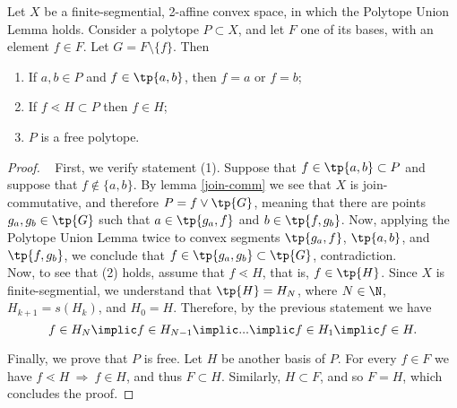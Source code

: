 \documentclass[12pt, a4paper]{article}
\newcommand{\btw}{\lessdot}
\begin{document}
\begin{theorem}\label{th-segm-free}
    Let \(X\) be a finite-segmential, 2-affine convex space, in which the Polytope Union Lemma holds. Consider a polytope \(P \subset X\), and let \(F\) one of its bases, with an element \(f \in F\). Let \(G = F \setminus \{f\}\). Then

    \begin{enumerate}
        \item If \(a, b \in P\) and \(f \in \tp{a, b}\), then \(f = a\) or \(f = b\);
        \item If \(f \btw H \subset P\) then \(f \in H\);
        \item \(P\) is a free polytope.
    \end{enumerate}
\end{theorem}
\begin{proof}~
    First, we verify statement (1). Suppose that \(f \in \tp{a, b} \subset P\) and suppose that \(f \nin \{a, b\}\). By lemma \ref{join-comm} we see that \(X\) is join-commutative, and therefore \(P = f \vee \tp{G}\), meaning that there are points \(g_a, g_b \in \tp{G}\) such that \(a \in \tp{g_a, f}\) and \(b \in \tp{f, g_b}\). Now, applying the Polytope Union Lemma twice to convex segments \(\tp{g_a, f}\), \(\tp{a, b}\), and \(\tp{f, g_b}\), we conclude that \(f \in \tp{g_a, g_b} \subset \tp{G}\), contradiction.\\

    Now, to see that (2) holds, assume that \(f \btw H\), that is, \(f \in \tp{H}\). Since \(X\) is finite-segmential, we understand that \(\tp{H} = H_N\), where \(N \in \N\), \(H_{k+1} = s(H_k)\), and \(H_0 = H\). Therefore, by the previous statement we have \[f \in H_N \implic f \in H_{N-1} \implic ... \implic f \in H_1 \implic f \in H.\]

    Finally, we prove that \(P\) is free. Let \(H\) be another basis of \(P\). For every \(f \in F\) we have \(f \btw H \ \Rightarrow \ f \in H\), and thus \(F \subset H\). Similarly, \(H \subset F\), and so \(F = H\), which concludes the proof.
\end{proof}
\end{document}
